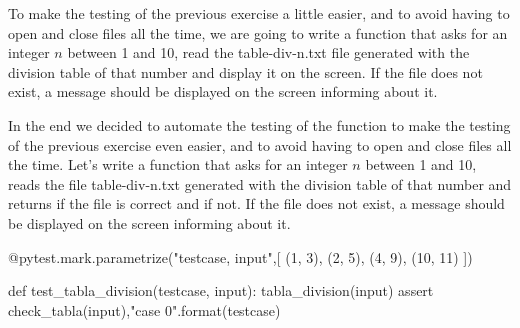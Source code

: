 \begin{exercise}
To make the testing of the previous exercise a little easier, and to avoid having to open and close files all the time, we are going to write a function  that asks for an integer $n$ between 1 and 10, read the table-div-n.txt file generated with the division table of that number and display it on the screen. If the file does not exist, a message should be displayed on the screen informing about it.
\end{exercise}


\begin{exercise}
In the end we decided to automate the testing of the function to make the testing of the previous exercise even easier, and to avoid having to open and close files all the time. Let's write a function  that asks for an integer $n$ between 1 and 10, reads the file table-div-n.txt generated with the division table of that number and returns  if the file is correct and  if not. If the file does not exist, a message should be displayed on the screen informing about it.


\begin{python}
@pytest.mark.parametrize("testcase, input",[
(1, 3),
(2, 5),
(4, 9),
(10, 11)
])              

def test_tabla_division(testcase, input):
    tabla_division(input)
    assert check_tabla(input),"case {0}".format(testcase)
\end{python}
\end{exercise}

